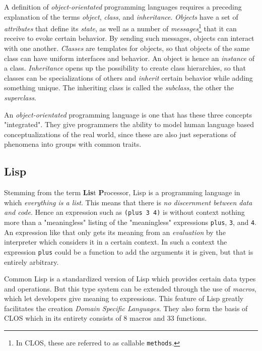 \documentclass[oribibl]{llncs}
\begin{document}
A definition of \emph{object-orientated} programming languages requires a preceding explanation of the terms \emph{object}, \emph{class}, and \emph{inheritance}. \emph{Objects} have a set of \emph{attributes} that define its \emph{state}, as well as a number of \emph{messages}\footnote{In CLOS, these are referred to as callable \texttt{methods}.} that it can receive to evoke certain behavior. By sending such messages, objects can interact with one another. \emph{Classes} are templates for objects, so that objects of the same class can have uniform interfaces and behavior. An object is hence an \emph{instance} of a class. \emph{Inheritance} opens up the possibility to create class hierarchies, so that classes can be specializations of others and \emph{inherit} certain behavior while adding something unique. The inheriting class is called the \emph{subclass}, the other the \emph{superclass}.

An \emph{object-orientated} programming language is one that has these three concepts "integrated". They give programmers the ability to model human language based conceptualizations of the real world, since these are also just seperations of phenomena into groups with common traits.

\subsection{Lisp}
\label{sec:lisp}

Stemming from the term \textbf{Lis}t \textbf{P}rocessor, Lisp is a programming language in which \emph{everything is a list}. This means that there is \emph{no discernment between data and code}. Hence an expression such as \texttt{(plus 3 4)} is without context nothing more than a "meaningless" listing of the "meaningless" expressions \texttt{plus}, \texttt{3}, and \texttt{4}. An expression like that only gets its meaning from an \emph{evaluation} by the interpreter which considers it in a certain context. In such a context the expression \texttt{plus} could be a function to add the arguments it is given, but that is entirely arbitrary. 

Common Lisp is a standardized version of Lisp which provides certain data types and operations. But this type system can be extended through the use of \emph{macros}, which let developers give meaning to expressions. This feature of Lisp greatly facilitates the creation \emph{Domain Specific Languages}. \cite{fowler2011domain-specific} They also form the basis of CLOS which in its entirety consists of 8 macros and 33 functions.
\end{document}
